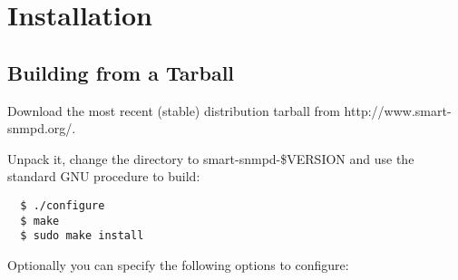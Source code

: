 \section{Installation}

\subsection{Building from a Tarball}

\label{build-tarball}

Download the most recent (stable) distribution tarball from
http://www.smart-snmpd.org/.

Unpack it, change the directory to smart-snmpd-\${VERSION} and
use the standard GNU procedure to build:

\begin{verbatim}
  $ ./configure
  $ make
  $ sudo make install
\end{verbatim}

Optionally you can specify the following options to configure:

